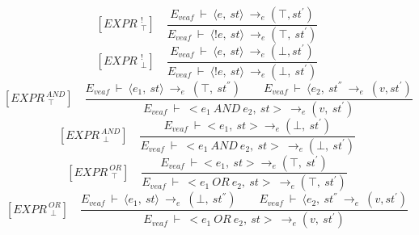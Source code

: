 \[	
[EXPR^{\ \ !}_{\ \ \top}] \quad	
\dfrac{E_{veaf} \ \vdash \ \langle e, \ st \rangle \ \rightarrow_e (\top, st^{'})}{E_{veaf} \ \vdash \ \langle !e, \ st \rangle \ \rightarrow_e (\top, \ st^{'})}	
\] \newline
\[	
[EXPR^{\ \ !}_{\ \ \bot}] \quad	
\dfrac{E_{veaf} \ \vdash \ \langle e, \ st \rangle \ \rightarrow_e (\bot, st^{'})}{E_{veaf} \ \vdash \ \langle !e, \ st \rangle \ \rightarrow_e (\bot, \ st^{'})}	
\]\newline
\[	
[EXPR^{\ AND}_{\ \ \top}] \quad	
\dfrac{E_{veaf} \ \vdash \ \langle e_1, \ st \rangle \ \rightarrow_e \ (\top, \ st^{''}) \qquad E_{veaf} \ \vdash \ \langle e_2, \ st^{''} \ \rightarrow_e \ (v, st^{'})}{E_{veaf} \ \vdash \ <e_1 \ AND \ e_2, \ st> \ \rightarrow_e (v, \ st^{'})}	
\] \newline
\[	
[EXPR^{\ AND}_{\ \ \bot}] \quad	
\dfrac{E_{veaf} \ \vdash <e_1, \ st> \rightarrow_e (\bot, \ st^{'}) }{E_{veaf} \ \vdash \ <e_1 \ AND \ e_2, \ st> \ \rightarrow_e (\bot, \ st^{'})}	
\]\newline
\[	
[EXPR^{\ OR}_{\ \ \top}] \quad	
\dfrac{E_{veaf} \ \vdash <e_1, \ st> \rightarrow_e (\top, \ st^{'}) }{E_{veaf} \ \vdash \ <e_1 \ OR \ e_2, \ st> \ \rightarrow_e (\top, \ st^{'})}	
\]\newline
\[	
[EXPR^{\ OR}_{\ \ \bot}] \quad	
\dfrac{E_{veaf} \ \vdash \ \langle e_1, \ st \rangle \ \rightarrow_e \ (\bot, \ st^{''}) \qquad E_{veaf} \ \vdash \ \langle e_2, \ st^{''} \ \rightarrow_e \ (v, st^{'})}{E_{veaf} \ \vdash \ <e_1 \ OR \ e_2, \ st> \ \rightarrow_e (v, \ st^{'})}
\]